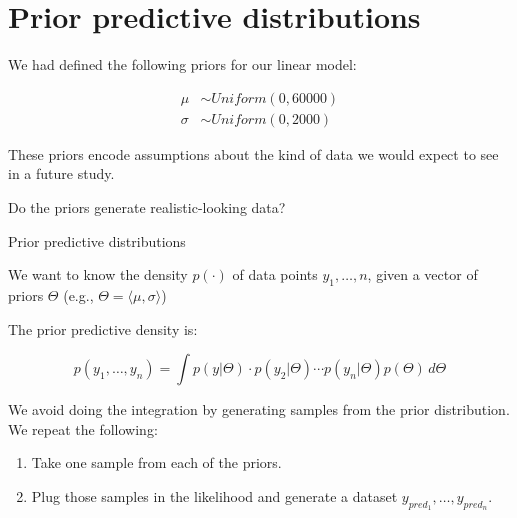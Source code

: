 \documentclass[12pt,ignorenonframetext,aspectratio=169]{beamer}
\providecommand{\tightlist}{%
  \setlength{\itemsep}{0pt}\setlength{\parskip}{0pt}}
\begin{document}
\hypertarget{sec:priorpred}{%
\section{Prior predictive distributions}\label{sec:priorpred}}

We had defined the following priors for our linear model:

\begin{equation}
\begin{aligned}
\mu &\sim Uniform(0, 60000) \\
\sigma &\sim Uniform(0, 2000) 
\end{aligned}
\label{eq:rtpriorsrepeated}
\end{equation}

These priors encode assumptions about the kind of data we would expect to see in a future study.

Do the priors generate realistic-looking data?

\begin{frame}{Prior predictive distributions}
\protect\hypertarget{prior-predictive-distributions}{}

We want to know the density \(p(\cdot)\) of data points \(y_1,\dots,n\), given a vector of priors \(\Theta\) (e.g., \(\Theta=\langle\mu,\sigma \rangle\))

The prior predictive density is:

\begin{equation}
p(y_1,\dots,y_n)= \int p(y|\Theta)\cdot p(y_2|\Theta)\cdots p(y_n|\Theta) p(\Theta) \, d\Theta 
\end{equation}

We avoid doing the integration by generating samples from the prior distribution. We repeat the following:

\begin{enumerate}
\tightlist
\item
  Take one sample from each of the priors.
\item
  Plug those samples in the likelihood and generate a dataset \(y_{pred_1},\ldots,y_{pred_n}\).
\end{enumerate}

\end{frame}
\end{document}
